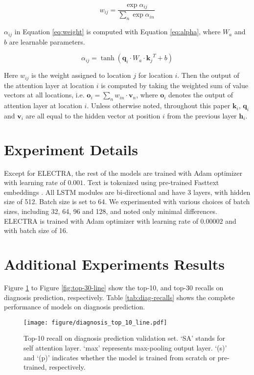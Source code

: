 \documentclass[11pt,a4paper]{article}
\begin{document}
\begin{equation}\label{eq:weight}
    w_{ij}=\frac{\exp \alpha_{ij}}{\sum_n\exp \alpha_{in}}
\end{equation}

$\alpha_{ij}$ in Equation \ref{eq:weight} is computed with Equation \ref{eq:alpha}, where $W_a$ and $b$ are learnable parameters.

\begin{equation}\label{eq:alpha}
    \alpha_{ij}=\tanh(\mathbf{q}_i\cdot W_a \cdot {\mathbf{k}_j}^T+b)
\end{equation}

Here $w_{ij}$ is the weight assigned to location $j$ for location $i$. Then the output of the attention layer at location $i$ is computed by taking the weighted sum of value vectors at all locations, i.e. $\mathbf{o}_i=\sum_n w_{in} \cdot \mathbf{v}_n$, where $\mathbf{o}_i$ denotes the output of attention layer at location $i$. Unless otherwise noted, throughout this paper $\mathbf{k}_i$, $\mathbf{q}_i$ and $\mathbf{v}_i$ are all equal to the hidden vector at position $i$ from the previous layer $\mathbf{h}_i$.

\section{Experiment Details}\label{app:exp-setup}

Except for ELECTRA, the rest of the models are trained with Adam optimizer \citep{Kingma2014} with learning rate of $0.001$. Text is tokenized using pre-trained Fasttext embeddings \citep{Bojanowski2017EnrichingInformation}. All LSTM modules are bi-directional and have 3 layers, with hidden size of 512. Batch size is set to 64. We experimented with various choices of batch sizes, including 32, 64, 96 and 128, and noted only minimal differences. ELECTRA is trained with Adam optimizer with learning rate of $0.00002$ and with batch size of 16.

\section{Additional Experiments Results}\label{app:add-results}

Figure \ref{fig:top-10-line} to Figure \ref{fig:top-30-line} show the top-10, and top-30 recalls on diagnosis prediction, respectively. Table \ref{tab:diag-recalls} shows the complete performance of models on diagnosis prediction.

\begin{figure}[hp]
    \centering
    \texttt{[image: figure/diagnosis\_top\_10\_line.pdf]}
    \caption{Top-10 recall on diagnosis prediction validation set. `SA' stands for self attention layer. `max' represents max-pooling output layer. `(s)' and `(p)' indicates whether the model is trained from scratch or pre-trained, respectively.}
    \label{fig:top-10-line}
\end{figure}
\end{document}
